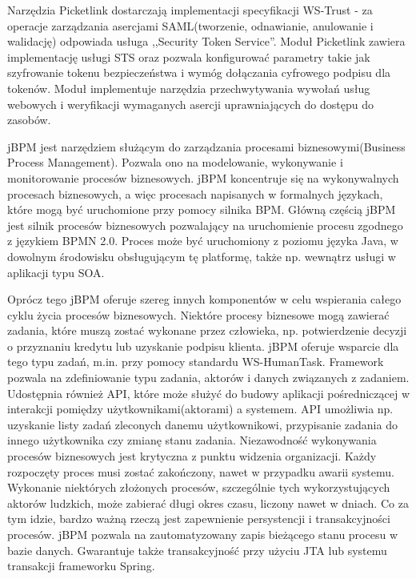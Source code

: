 Narzędzia Picketlink dostarczają implementacji specyfikacji WS-Trust - za operacje zarządzania asercjami SAML(tworzenie, odnawianie, anulowanie i walidację) odpowiada usługa ,,Security Token Service''. Moduł Picketlink zawiera implementację usługi STS oraz pozwala konfigurować parametry takie jak szyfrowanie tokenu bezpieczeństwa i wymóg dołączania cyfrowego podpisu dla tokenów. Moduł implementuje narzędzia przechwytywania wywołań usług webowych i weryfikacji wymaganych asercji uprawniających do dostępu do zasobów. 


\label{sec:bpm}

jBPM jest narzędziem służącym do zarządzania procesami biznesowymi(Business Process Management). Pozwala ono na modelowanie, wykonywanie i monitorowanie procesów biznesowych. jBPM koncentruje się na wykonywalnych procesach biznesowych, a więc procesach napisanych w formalnych językach, które mogą być uruchomione przy pomocy silnika BPM.
Główną częścią jBPM jest silnik procesów biznesowych pozwalający na uruchomienie procesu zgodnego z językiem BPMN 2.0. Proces może być uruchomiony z poziomu języka Java, w dowolnym środowisku obsługującym tę platformę, także np. wewnątrz usługi w aplikacji typu SOA. 

Oprócz tego jBPM oferuje szereg innych komponentów w celu wspierania całego cyklu życia procesów biznesowych\cite{jBPM13}. Niektóre procesy biznesowe mogą zawierać zadania, które muszą zostać wykonane przez człowieka, np. potwierdzenie decyzji o przyznaniu kredytu lub uzyskanie podpisu klienta. jBPM oferuje wsparcie dla tego typu zadań, m.in. przy pomocy standardu WS-HumanTask. Framework pozwala na zdefiniowanie typu zadania, aktorów i danych związanych z zadaniem. Udostępnia również API, które może służyć do budowy aplikacji pośredniczącej w interakcji pomiędzy użytkownikami(aktorami) a systemem. API umożliwia np.  uzyskanie listy zadań zleconych danemu użytkownikowi, przypisanie zadania do innego użytkownika czy zmianę stanu zadania.
Niezawodność wykonywania procesów biznesowych jest krytyczna z punktu widzenia organizacji. Każdy rozpoczęty proces musi zostać zakończony, nawet w przypadku awarii systemu. Wykonanie niektórych złożonych procesów, szczególnie tych wykorzystujących aktorów ludzkich,  może zabierać długi okres czasu, liczony nawet w dniach. Co za tym idzie, bardzo ważną rzeczą jest zapewnienie persystencji i transakcyjności procesów. jBPM pozwala na zautomatyzowany zapis bieżącego stanu procesu w bazie danych. Gwarantuje także transakcyjność przy użyciu JTA lub systemu transakcji frameworku Spring.

